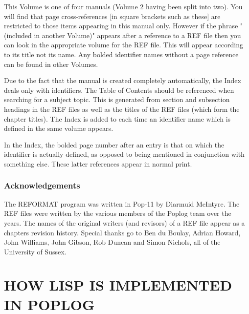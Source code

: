 This Volume is one of four manuals (Volume 2 having been split into
two). You will find that page cross-references [in square brackets such
as these] are restricted to those items appearing in this manual only.
However if the phrase "(included in another Volume)" appears after a
reference to a REF file then you can look in the appropriate volume for
the REF file. This will appear according to its title not its name.
	Any bolded identifier names without a page reference can be found in
other Volumes.


Due to the fact that the manual is created completely automatically, the
Index deals only with identifiers. The Table of Contents should be
referenced when searching for a subject topic. This is generated from
section and subsection headings in the REF files as well as the titles
of the REF files (which form the chapter titles). The Index is added to each
time an identifier name which is defined in the same volume appears.

	 In the Index, the bolded page number after an entry is that on
which the identifier is actually defined, as opposed to being mentioned
in conjunction with something else. These latter references appear in
normal print.


\section*{Acknowledgements}

The REFORMAT program was written in Pop-11 by Diarmuid McIntyre. The REF
files were written by the various members of the Poplog team over the
years. The names of the original writers (and revisors) of a REF file
appear as a chapters revision history. Special thanks go to Ben du
Boulay, Adrian Howard, John Williams, John Gibson, Rob Duncan and Simon
Nichols, all of the University of Sussex.



\tableofcontents





\part{HOW LISP IS IMPLEMENTED IN POPLOG}

